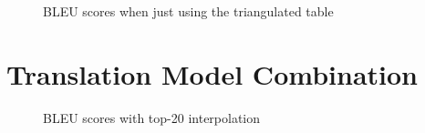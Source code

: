  \begin{figure}[ht]
 	\small
 	\centering
	 
	\label{table:eparltopn}
	\caption{BLEU scores when just using the triangulated table}
 \end{figure}


\section{Translation Model Combination}

\begin{figure}[ht]
	\small
	\centering
	
	\label{table:eparltopninter}
	\caption{BLEU scores with top-20 interpolation}
\end{figure}










